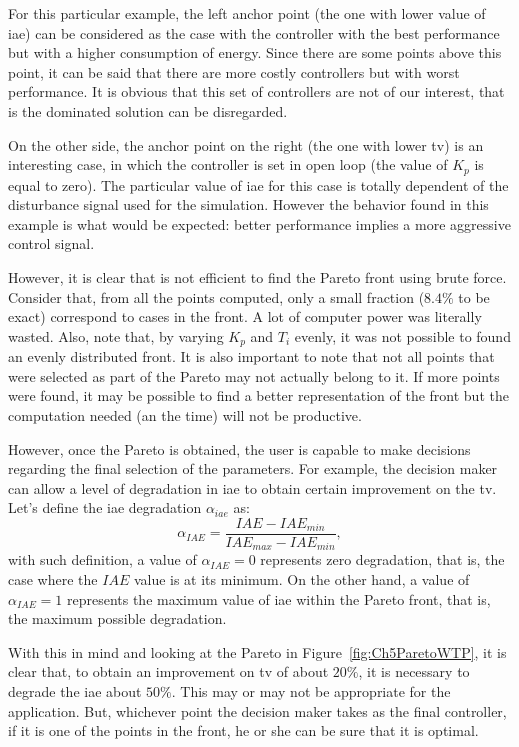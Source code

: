 For this particular example, the left anchor point (the one with lower value of \gls{iae}) can be considered as the case with the controller with the best performance but with a higher consumption of energy. Since there are some points above this point, it can be said that there are more costly controllers but with worst performance. It is obvious that this set of controllers are not of our interest, that is the dominated solution can be disregarded.

On the other side, the anchor point on the right (the one with lower \gls{tv}) is an interesting case, in which the controller is set in open loop (the value of $K_p$ is equal to zero). The particular value of \gls{iae} for this case is totally dependent of the disturbance signal used for the simulation. However the behavior found in this example is what would be expected: better performance implies a more aggressive control signal.

However, it is clear that is not efficient to find the Pareto front using brute force. Consider that, from all the points computed, only a small fraction ($8.4\%$ to be exact) correspond to cases in the front. A lot of computer power was literally wasted. Also, note that, by varying $K_p$ and $T_i$ evenly, it was not possible to found an evenly distributed front. It is also important to note that not all points that were selected as part of the Pareto may not actually belong to it. If more points were found, it may be possible to find a better representation of the front but the computation needed (an the time) will not be productive.

However, once the Pareto is obtained, the user is capable to make decisions regarding the final selection of the parameters. For example, the decision maker can allow a level of degradation in \gls{iae} to obtain certain improvement on the \gls{tv}. Let's define the \gls{iae} degradation $\alpha_{iae}$ as:
\begin{equation*}
	\alpha_{IAE} = \frac{IAE - IAE_{min}}{IAE_{max}-IAE_{min}},
\end{equation*}
%
with such definition, a value of $\alpha_{IAE} = 0$ represents zero degradation, that is, the case where the $IAE$ value is at its minimum. On the other hand, a value of $\alpha_{IAE} = 1$ represents the maximum value of \gls{iae} within the Pareto front, that is, the maximum possible degradation.

With this in mind and looking at the Pareto in Figure~\ref{fig:Ch5ParetoWTP}, it is clear that, to obtain an improvement on \gls{tv} of about $20\%$, it is necessary to degrade the \gls{iae} about $50\%$. This may or may not be appropriate for the application. But, whichever point the decision maker takes as the final controller, if it is one of the points in the front, he or she can be sure that it is optimal.

